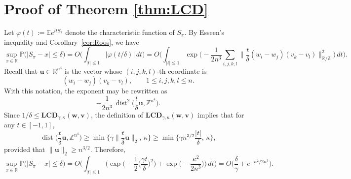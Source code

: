 \documentclass[reqno]{amsart}
\newcommand\R{{\mathbb{R}}}
\newcommand\Z{{\mathbb{Z}}}
\renewcommand\P{{\mathbb{P}}}
\newcommand\E{{\mathbb{E}}}
\newcommand\dist{\operatorname{dist}}
\newcommand\BMu{{\bm u}}
\newcommand\BMv{{\bm v}}
\newcommand\BMw{{\bm w}}
\newcommand\LCD{\mathbf{LCD}}
\theoremstyle{plain}
\theoremstyle{definition}
\begin{document}
\section{Proof of Theorem \ref{thm:LCD} }\label{sect:LCD}

Let $\varphi(t):=\E e^{itS_{\pi}}$ denote the characteristic function of $S_{\pi}$.
By Esseen’s inequality and Corollary~\ref{cor:Roos}, we have
\[
\sup_{x\in\R}\P\big(|S_{\pi}-x|\le \delta\big)
= O\Big(\int_{|t|\le 1}\big|\varphi(t/\delta)\big|\,dt\Big)
=
O\Big(\int_{|t|\le 1}
\exp\Big(
-\frac{1}{2n^{3}}
\sum_{i,j,k,l}
\Big\|
\frac{t}{\delta}(w_i-w_j)(v_k-v_l)
\Big\|_{\R/\Z}^{2}
\Big)\,dt\Big).
\]
Recall that $\BMu\in\R^{n^{4}}$ is the vector whose $(i,j,k,l)$-th coordinate is
\[
(w_i-w_j)(v_k-v_l), \qquad 1\le i,j,k,l\le n.
\]
With this notation, the exponent may be rewritten as
\[
-\frac{1}{2n^{3}}\,
\dist^{2}\Big(\frac{t}{\delta}\BMu,\Z^{n^{4}}\Big).
\]
Since $1/\delta \le \LCD_{\gamma,\kappa}(\BMw,\BMv)$, the definition of
$\LCD_{\gamma,\kappa}(\BMw,\BMv)$ implies that for any $t \in [-1,1]$,
\[
\dist\Big(\frac{t}{\delta}\BMu,\Z^{n^4}\Big)
\ge
\min\Big\{\gamma \Big\|\frac{t}{\delta}\BMu\Big\|_{2},\, \kappa\Big\}
\ge
\min\Big\{\gamma n^{3/2}\frac{|t|}{\delta},\, \kappa\Big\},
\]
provided that $\|\BMu\|_{2} \ge n^{3/2}$.
Therefore,
\[
\sup_{x\in\R}\P\big(|S_{\pi}-x|\le \delta\big)
=O\Big(
\int_{|t|\le 1}
\Big(
\exp\Big(-\frac12\Big(\frac{\gamma t}{\delta}\Big)^2\Big)
+ \exp\Big(-\frac{\kappa^{2}}{2n^{3}}\Big)
\Big)\,dt \Big)
=O\Big(
\frac{\delta}{\gamma}+e^{-\kappa^{2}/2n^{3}}\Big).
\]
\end{document}
